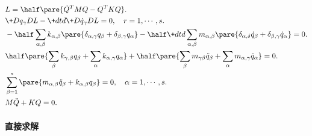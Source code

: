 \documentclass[../LectureNotes.tex]{subfiles}
\begin{document}
\begin{align*}
    &L = \half \pare{\dot{Q}^T MQ - Q^TKQ}. \\
    &\+D{q_\gamma}DL - \+dtd{} \+D{\dot{q}_\gamma}DL = 0,\quad r = 1,\cdots, s. \\
    & -\half \sum_{\alpha,\beta} k_{\alpha,\beta} \pare{\delta_{\alpha,\gamma}q_\beta + \delta_{\beta,\gamma} q_\alpha} - \half \+dtd{} \sum_{\alpha,\beta} m_{\alpha,\beta} \pare{\delta_{\alpha,\delta} \dot{q}_\beta + \delta_{\beta,\gamma}\dot{q}_\alpha} = 0. \\
    & \half\pare{\sum_\beta k_{\gamma,\beta} q_\beta + \sum_\alpha k_{\alpha,\gamma}q_\alpha} + \half\pare{\sum_\beta m_{\gamma\beta}\ddot{q}_\beta + \sum_\alpha m_{\alpha,\gamma}\ddot{q}_\alpha} = 0.\\
    & \sum_{\beta=1}^s \pare{m_{\alpha,\beta}\ddot{q}_\beta + k_{\alpha,\beta}q_\beta} = 0,\quad \alpha = 1,\cdots, s. \\
    & M\ddot{Q} + KQ = 0.
\end{align*}

\paragraph{直接求解} %
\label{par:直接求解}
\end{document}
